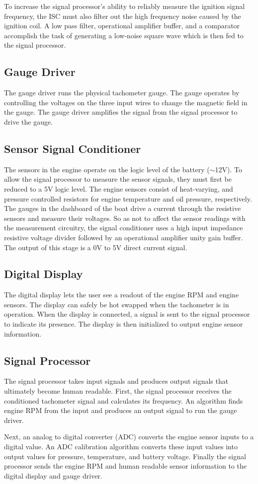 To increase the signal processor's ability to reliably measure the ignition signal frequency, the ISC must also filter out the high frequency noise caused by the ignition coil. A low pass filter, operational amplifier buffer, and a comparator accomplish the task of generating a low-noise square wave which is then fed to the signal processor.

\subsection{Gauge Driver}

The gauge driver runs the physical tachometer gauge. The gauge operates by controlling the voltages on the three input wires to change the magnetic field in the gauge. The gauge driver amplifies the signal from the signal processor to drive the gauge.

\subsection{Sensor Signal Conditioner}

The sensors in the engine operate on the logic level of the battery ($\sim$12V). To allow the signal processor to measure the sensor signals, they must first be reduced to a 5V logic level. The engine sensors consist of heat-varying, and pressure controlled resistors for engine temperature and oil pressure, respectively. The gauges in the dashboard of the boat drive a current through the resistive sensors and measure their voltages. So as not to affect the sensor readings with the measurement circuitry, the signal conditioner uses a high input impedance resistive voltage divider followed by an operational amplifier unity gain buffer. The output of this stage is a 0V to 5V direct current signal.

\subsection{Digital Display}

The digital display lets the user see a readout of the engine RPM and engine sensors. The display can safely be hot swapped when the tachometer is in operation. When the display is connected, a signal is sent to the signal processor to indicate its presence. The display is then initialized to output engine sensor information.

\subsection{Signal Processor}
The signal processor takes input signals and produces output signals that ultimately become human readable. First, the signal processor receives the conditioned tachometer signal and calculates its frequency. An algorithm finds engine RPM from the input and produces an output signal to run the gauge driver.

Next, an analog to digital converter (ADC) converts the engine sensor inputs to a digital value. An ADC calibration algorithm converts these input values into output values for pressure, temperature, and battery voltage. Finally the signal processor sends the engine RPM and human readable sensor information to the digital display and gauge driver.
